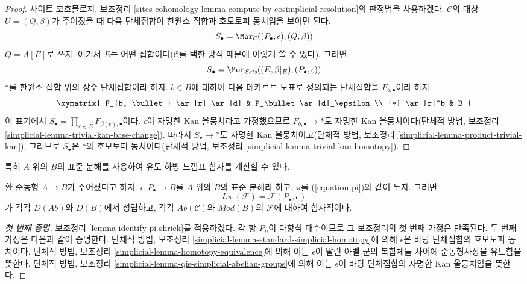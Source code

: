 \begin{proof}
사이트 코호몰로지, 보조정리
\ref{sites-cohomology-lemma-compute-by-cosimplicial-resolution}의 판정법을
사용하겠다. $\mathcal{C}$의 대상 $U=(Q,\beta)$가 주어졌을 때 다음
단체집합이 한원소 집합과 호모토피 동치임을 보이면 된다.
$$
S_\bullet = \Mor_\mathcal{C}((P_\bullet, \epsilon), (Q, \beta))
$$
$Q=A[E]$로 쓰자. 여기서 $E$는 어떤 집합이다($\mathcal{C}$를 택한
방식 때문에 이렇게 쓸 수 있다). 그러면
$$
S_\bullet = \Mor_{\textit{Sets}}((E, \beta|_E), (P_\bullet, \epsilon))
$$
$*$를 한원소 집합 위의 상수 단체집합이라 하자. $b\in B$에 대하여 다음
데카르트 도표로 정의되는 단체집합을 $F_{b,\bullet}$이라 하자.
$$
\xymatrix{
F_{b, \bullet} \ar[r] \ar[d] & P_\bullet \ar[d]_\epsilon \\
{*} \ar[r]^b & B
}
$$
이 표기에서 $S_\bullet=\prod_{e\in E}F_{\beta(e),\bullet}$이다.
$\epsilon$이 자명한 Kan 올뭉치라고 가정했으므로
$F_{b,\bullet}\to *$도 자명한 Kan 올뭉치이다(단체적 방법, 보조정리
\ref{simplicial-lemma-trivial-kan-base-change}). 따라서
$S_\bullet\to *$도 자명한 Kan 올뭉치이고(단체적 방법, 보조정리
\ref{simplicial-lemma-product-trivial-kan}), 그러므로 $S_\bullet$은 $*$와
호모토피 동치이다(단체적 방법, 보조정리
\ref{simplicial-lemma-trivial-kan-homotopy}).
\end{proof}

\noindent
특히 $A$ 위의 $B$의 표준 분해를 사용하여 유도 하방 느낌표 함자를
계산할 수 있다.

\begin{lemma}
\label{lemma-pi-shriek-standard}
환 준동형 $A\to B$가 주어졌다고 하자. $\epsilon:P_\bullet\to B$를
$A$ 위의 $B$의 표준 분해라 하고, $\pi$를 (\ref{equation-pi})와 같이
두자. 그러면
$$
L\pi_!(\mathcal{F}) = \mathcal{F}(P_\bullet, \epsilon)
$$
가 각각 $D(\textit{Ab})$와 $D(B)$에서 성립하고, 각각
$\textit{Ab}(\mathcal{C})$와 $\textit{Mod}(\underline{B})$의
$\mathcal{F}$에 대하여 함자적이다.
\end{lemma}

\begin{proof}[첫 번째 증명]
보조정리 \ref{lemma-identify-pi-shriek}를 적용하겠다. 각 항 $P_n$이
다항식 대수이므로 그 보조정리의 첫 번째 가정은 만족된다. 두 번째 가정은
다음과 같이 증명한다. 단체적 방법, 보조정리
\ref{simplicial-lemma-standard-simplicial-homotopy}에 의해 $\epsilon$은
바탕 단체집합의 호모토피 동치이다. 단체적 방법, 보조정리
\ref{simplicial-lemma-homotopy-equivalence}에 의해 이는 $\epsilon$이 딸린
아벨 군의 복합체들 사이에 준동형사상을 유도함을 뜻한다. 단체적 방법,
보조정리 \ref{simplicial-lemma-qis-simplicial-abelian-groups}에 의해 이는
$\epsilon$이 바탕 단체집합의 자명한 Kan 올뭉치임을 뜻한다.
\end{proof}

